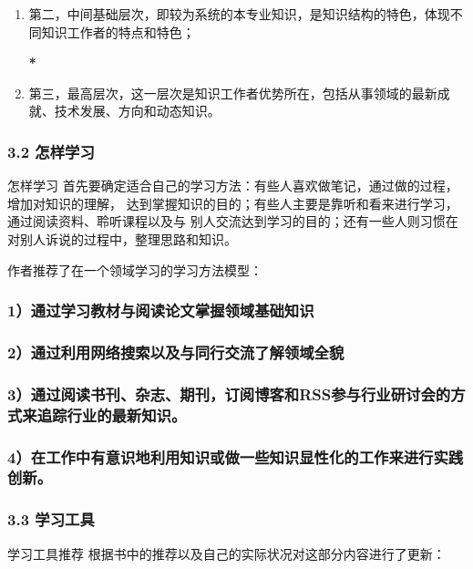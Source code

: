\documentclass[11pt]{ctexart}
\begin{document}
{{{{\begin{enumerate}
\item 第二，中间基础层次，即较为系统的本专业知识，是知识结构的特色，体现不同知识工作者的特点和特色；
\label{sec:org3419390}

\textbf{\textbf{*}}

\item 第三，最高层次，这一层次是知识工作者优势所在，包括从事领域的最新成就、技术发展、方向和动态知识。
\label{sec:orgf766a28}
\end{enumerate}
\subsubsection{3.2 怎样学习}
\label{sec:orgf8a594a}

怎样学习
首先要确定适合自己的学习方法：有些人喜欢做笔记，通过做的过程，增加对知识的理解，
达到掌握知识的目的；有些人主要是靠听和看来进行学习，通过阅读资料、聆听课程以及与
别人交流达到学习的目的；还有一些人则习惯在对别人诉说的过程中，整理思路和知识。

作者推荐了在一个领域学习的学习方法模型：

\subsubsection{1）通过学习教材与阅读论文掌握领域基础知识}
\label{sec:org28dfb6a}

\subsubsection{2）通过利用网络搜索以及与同行交流了解领域全貌}
\label{sec:org37dd36c}

\subsubsection{3）通过阅读书刊、杂志、期刊，订阅博客和RSS参与行业研讨会的方式来追踪行业的最新知识。}
\label{sec:org3945fa6}

\subsubsection{4）在工作中有意识地利用知识或做一些知识显性化的工作来进行实践创新。}
\label{sec:org5e5e4f5}
\subsubsection{3.3 学习工具}
\label{sec:orgc46d9c7}

学习工具推荐
根据书中的推荐以及自己的实际状况对这部分内容进行了更新：

}}}}
\end{document}

